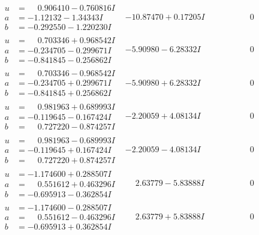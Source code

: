 \documentclass[1p]{elsarticle_modified}
\theoremstyle{definition}
\begin{document}
$$\begin{array}{c|c|c}
\begin{aligned}
u &= \phantom{-}0.906410 - 0.760816 I \\
a &= -1.12132 - 1.34343 I \\
b &= -0.292550 - 1.220230 I\end{aligned}
 & -10.87470 + 0.17205 I & \phantom{-0.000000 } 0 \\ \hline\begin{aligned}
u &= \phantom{-}0.703346 + 0.968542 I \\
a &= -0.234705 - 0.299671 I \\
b &= -0.841845 - 0.256862 I\end{aligned}
 & -5.90980 - 6.28332 I & \phantom{-0.000000 } 0 \\ \hline\begin{aligned}
u &= \phantom{-}0.703346 - 0.968542 I \\
a &= -0.234705 + 0.299671 I \\
b &= -0.841845 + 0.256862 I\end{aligned}
 & -5.90980 + 6.28332 I & \phantom{-0.000000 } 0 \\ \hline\begin{aligned}
u &= \phantom{-}0.981963 + 0.689993 I \\
a &= -0.119645 - 0.167424 I \\
b &= \phantom{-}0.727220 - 0.874257 I\end{aligned}
 & -2.20059 + 4.08134 I & \phantom{-0.000000 } 0 \\ \hline\begin{aligned}
u &= \phantom{-}0.981963 - 0.689993 I \\
a &= -0.119645 + 0.167424 I \\
b &= \phantom{-}0.727220 + 0.874257 I\end{aligned}
 & -2.20059 - 4.08134 I & \phantom{-0.000000 } 0 \\ \hline\begin{aligned}
u &= -1.174600 + 0.288507 I \\
a &= \phantom{-}0.551612 + 0.463296 I \\
b &= -0.695913 - 0.362854 I\end{aligned}
 & \phantom{-}2.63779 - 5.83888 I & \phantom{-0.000000 } 0 \\ \hline\begin{aligned}
u &= -1.174600 - 0.288507 I \\
a &= \phantom{-}0.551612 - 0.463296 I \\
b &= -0.695913 + 0.362854 I\end{aligned}
 & \phantom{-}2.63779 + 5.83888 I & \phantom{-0.000000 } 0\\

\end{array}$$
\end{document}
